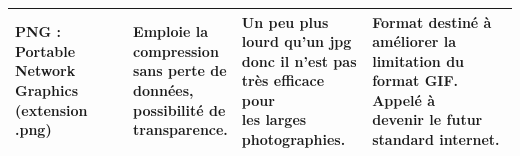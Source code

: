 \begin{table}[H]
\begin{tabular}{|l|l|l|l|}
		\hline
		\makecell{PNG : Portable\\
			Network\\
			Graphics\\
			(extension
			.png)}
		& \makecell{Emploie la\\
			compression\\
			sans perte de\\
			données,\\
			possibilité de\\
			transparence.} 
		& \makecell{Un peu plus\\
			lourd qu’un jpg\\
			donc il n’est pas\\
			très efficace pour\\
			les larges\\
			photographies.}
		&  \makecell{Format destiné à\\
			améliorer la\\
			limitation du\\
			format GIF. Appelé à\\
			devenir le futur\\
			standard internet.}   \\
		\hline
		

\end{tabular}
\end{table}
